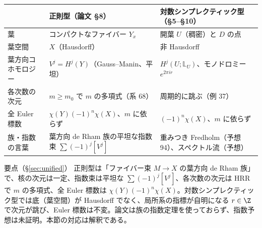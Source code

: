 \begin{center}
\renewcommand{\arraystretch}{1.2}
\begin{tabular}{>{\raggedright\arraybackslash}p{3.1cm}>{\raggedright\arraybackslash}p{5.4cm}>{\raggedright\arraybackslash}p{5.9cm}}
\toprule
 & 正則型（論文 \S8） & 対数シンプレクティック型（\S5--\S10）\\
\midrule
葉 & コンパクトなファイバー $Y_x$ & 開葉 $U$（稠密）と $D$ の点\\
葉空間 & $X$（Hausdorff） & 非 Hausdorff\\
葉方向コホモロジー & $V^j=H^j(Y)$（Gauss--Manin、平坦） & $H^j(U;\mathbb L_U)$、モノドロミー $e^{2\pi ir}$\\
各次数の次元 & $m\ge m_0$ で $m$ の多項式（系 68） & 周期的に跳ぶ（例 37）\\
全 Euler 標数 & $\chi(Y)(-1)^n\chi(X)$、$m$ に依らず & $(-1)^n\chi(X)$、$m$ に依らず\\
族・指数の言葉 & 葉方向 de Rham 族の平坦な指数束 $\sum(-1)^j[V^j]$ & 重みつき Fredholm（予想 94）、スペクトル流（予想）\\
\bottomrule
\end{tabular}
\end{center}
\begin{keybox}{要点（\S\ref{sec:unified}）}
正則型は「ファイバー束 $M\to X$ の葉方向 de Rham 族」で、核の次元は一定、指数束は平坦な $\sum(-1)^j[V^j]$、各次数の次元は HRR で $m$ の多項式、全 Euler 標数は $\chi(Y)(-1)^n\chi(X)$。対数シンプレクティック型では底（葉空間）が Hausdorff でなく、局所系の指標が自明になる $r\in\Z$ で次元が跳び、Euler 標数は不変。論文は族の指数定理を使っておらず、指数予想は未証明。本節の対応は解釈である。
\end{keybox}

